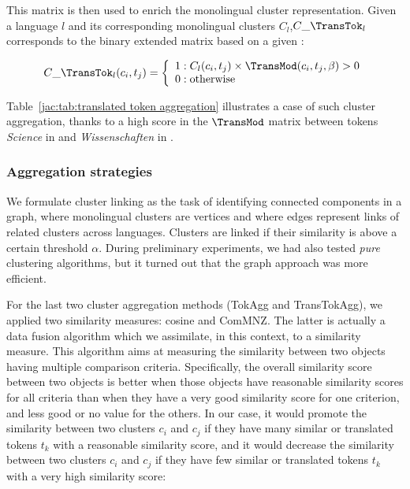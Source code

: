 \documentclass[output=paper]{langsci/langscibook}
\begin{document}
This matrix is then used to enrich the monolingual cluster
representation.  Given a language $l$ and its corresponding
monolingual clusters $C_{l}$,$C\_\TransTok_{l}$ corresponds to the
binary extended matrix based on a given :

{\setlength{\abovedisplayskip}{0pt}%
\setlength{\abovedisplayshortskip}{0pt}%
\begin{equation}
C\_\TransTok_{l}(c_i,t_j) =
\left\{
  \begin{array}{lr}
    1 : C_{l}(c_i,t_j) \times \TransMod(c_i,t_j,\beta) > 0\\
    0 : \text{otherwise}
  \end{array}
\right.
\end{equation}}

Table~\ref{jac:tab:translated token aggregation} illustrates a case of
such cluster aggregation, thanks to a high score in the $\TransMod$
matrix between tokens \textit{Science} in  and
\textit{Wissenschaften} in .

\subsubsection{Aggregation strategies}
\label{jac:aggregation clusters}

 
We formulate cluster linking as the task of identifying connected
components in a graph, where monolingual clusters are vertices and
where edges represent links of related clusters across
languages. Clusters are linked if their similarity is above a certain
threshold $\alpha$. During preliminary experiments, we had also tested
\emph{pure} clustering algorithms, but it turned out that the graph
approach was more efficient.

For the last two cluster aggregation methods (TokAgg and
TransTokAgg), we applied two similarity measures: cosine and
ComMNZ. The latter is actually a data fusion algorithm \citep{fox-94}
which we assimilate, in this context, to a similarity measure.  This
algorithm aims at measuring the similarity between two objects having
multiple comparison criteria. Specifically, the overall similarity
score between two objects is better when those objects have reasonable
similarity scores for all criteria than when they have a very good
similarity score for one criterion, and less good or no value for the
others.  In our case, it would promote the similarity between two
clusters $c_i$ and $c_j$ if they have many similar or translated
tokens $t_k$ with a reasonable similarity score, and it would decrease
the similarity between two clusters $c_i$ and $c_j$ if they have few
similar or translated tokens $t_k$ with a very high similarity score:
\end{document}
